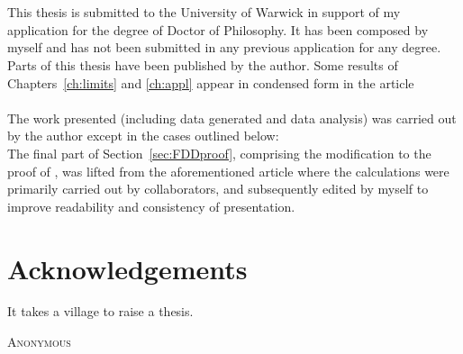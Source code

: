 \documentclass[oneside]{scrbook} %
\theoremstyle{definition}
\newcommand{\1}[1]{\mathbbm{1}_{#1}} %
\begin{document}




%
\chapter*{} %

This thesis is submitted to the University of Warwick in support of my application for the degree of Doctor of Philosophy. It has been composed by myself and has not been submitted in any previous application for any degree.
\\[5pt]
Parts of this thesis have been published by the author.
Some results of Chapters~\ref{ch:limits} and \ref{ch:appl} appear in condensed form in the article
\\
\\[5pt]
The work presented (including data generated and data analysis) was carried out by the author except in the cases outlined below:
\\
The final part of Section~\ref{sec:FDDproof}, comprising the modification to the proof of \textcite{koskela2018}, was lifted from the aforementioned article \parencite{brown2021} where the calculations were primarily carried out by collaborators, and subsequently edited by myself to improve readability and consistency of presentation.




\chapter*{Acknowledgements}
\epigraph{
It takes a village to raise a thesis.
}
{\textsc{Anonymous}} 
\end{document}

